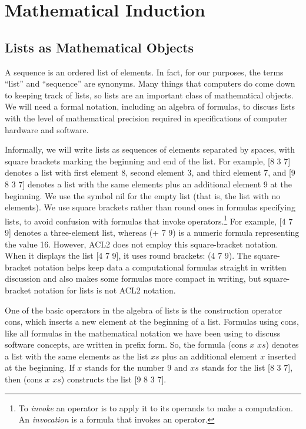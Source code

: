 \chapter{Mathematical Induction}
\label{ch:mathematical-induction}

\section{Lists as Mathematical Objects}
\label{sec:lists-as-obj}
A sequence
is an ordered list of elements.
In fact, for our purposes, the terms ``list'' and ``sequence'' are synonyms.
Many things that computers do come down to keeping track of lists,
so lists are an important class of mathematical objects.
We will need a formal notation, including an algebra of formulas,
to discuss lists with the level of mathematical precision
required in specifications of computer hardware and software.

Informally, we will write lists as sequences of elements separated by spaces,
with square brackets marking the beginning and end of the list.
For example, \textsf{[8 3 7]} denotes a list with first element 8,
second element 3, and third element 7, and
\textsf{[9 8 3 7]} denotes a list with the same elements
plus an additional element 9 at the beginning.
\label{nil-def}
We use the symbol \textsf{nil} for the empty list
(that is, the list with no elements).
\label{square-brackets}We use
square brackets
rather than round ones in formulas
specifying lists, to avoid confusion with formulas that
invoke operators.\footnote{To \emph{invoke}
an operator is to apply it to its operands
to make a computation.
An \emph{invocation} is a formula that invokes an operator.}
For example, \textsf{[4 7 9]} denotes a three-element list,
whereas \textsf{(+ 7 9)} is a numeric formula representing the value 16.
However, ACL2 does not employ this square-bracket notation.
When it displays the list \textsf{[4 7 9]},
it uses round brackets: \textsf{(4 7 9)}.
The square-bracket notation helps keep data a computational formulas
straight in written discussion and also makes some
formulas more compact in writing, but square-bracket
notation for lists is not ACL2 notation.

One of the basic operators in the algebra of lists is the
construction operator
\textsf{cons},
which inserts a new element at the beginning of a list.
Formulas using \textsf{cons}, like all formulas in
the mathematical notation we have been using to discuss software concepts,
are written in prefix form.
So, the formula \textsf{(cons $x$ $xs$)} denotes a list
with the same elements as the list $xs$
plus an additional element $x$ inserted at the beginning.
If $x$ stands for the number \textsf{9}
and $xs$ stands for the list \textsf{[8 3 7]},
then \textsf{(cons $x$ $xs$)} constructs the list \textsf{[9 8 3 7]}.

